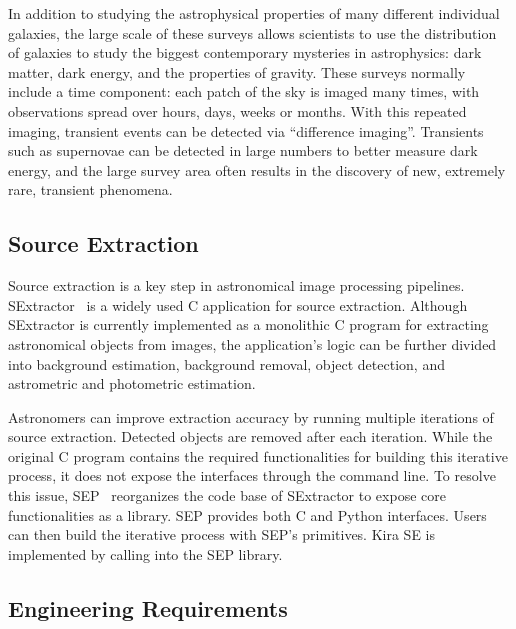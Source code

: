 \documentclass[conference]{IEEEtran}
\begin{document}
In addition to studying the astrophysical properties of many different individual galaxies,
the large scale of these surveys allows scientists to use the distribution of galaxies to
study the biggest contemporary mysteries in astrophysics: dark matter, dark energy, and 
the properties of gravity. These surveys normally include a time component: each patch of the sky is imaged many times,
with observations spread over hours, days, weeks or months. With this repeated imaging,
transient events can be detected via ``difference imaging''. Transients such as supernovae
can be detected in large numbers to better measure dark energy, and the large survey area
often results in the discovery of new, extremely rare, transient phenomena.

\subsection{Source Extraction}
\label{sec:Background-SE}
Source extraction is a key step in astronomical image processing pipelines.
SExtractor~\cite{bertin96} is a widely used C application for source extraction.
Although SExtractor is currently implemented as a monolithic C program for extracting astronomical
objects from images, the application's logic can be further divided into 
background estimation, background removal, object detection, and astrometric 
and photometric estimation.

Astronomers can improve extraction accuracy by running multiple iterations of source
extraction. Detected objects are removed after each iteration. While
the original C program contains the required functionalities for building this iterative process,
it does not expose the interfaces through the command line. To resolve this issue,
SEP~\cite{barbary2015} reorganizes the code base of SExtractor to expose core
functionalities as a library. SEP provides both C and Python interfaces. Users can then
build the iterative process with SEP's primitives. Kira SE is implemented by calling into
the SEP library.

\subsection{Engineering Requirements}
\label{sec:Background-EngReq}
\end{document}
